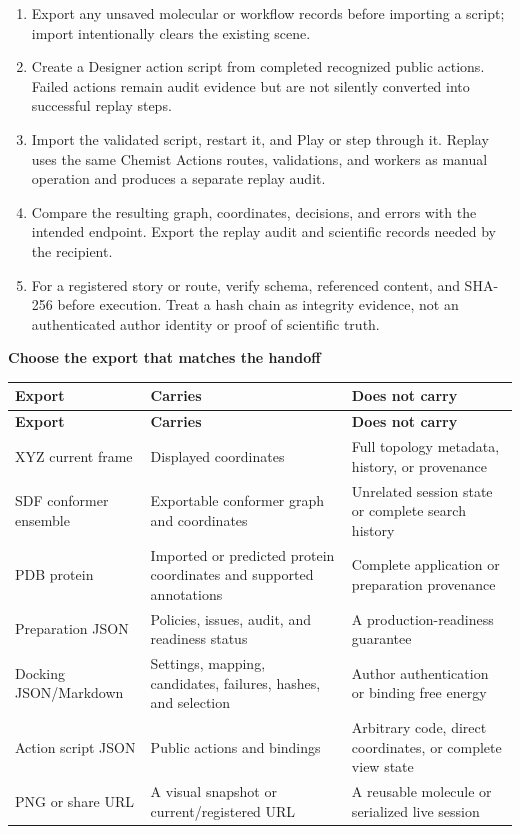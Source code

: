 \documentclass[10pt,letterpaper]{article}
\newcommand{\subhead}[1]{%
  \par\needspace{2\baselineskip}\vspace{2.5pt}%
  {\fontsize{10.91}{13.1}\selectfont\bfseries #1}\par\vspace{-1.5pt}}
\begin{document}
\begin{enumerate}
\item Export any unsaved molecular or workflow records before importing a script; import intentionally clears the existing scene.
\item Create a Designer action script from completed recognized public actions. Failed actions remain audit evidence but are not silently converted into successful replay steps.
\item Import the validated script, restart it, and Play or step through it. Replay uses the same Chemist Actions routes, validations, and workers as manual operation and produces a separate replay audit.
\item Compare the resulting graph, coordinates, decisions, and errors with the intended endpoint. Export the replay audit and scientific records needed by the recipient.
\item For a registered story or route, verify schema, referenced content, and SHA-256 before execution. Treat a hash chain as integrity evidence, not an authenticated author identity or proof of scientific truth.
\end{enumerate}

\subhead{Choose the export that matches the handoff}

\begingroup
\fontsize{8.0}{9.5}\selectfont
\begin{longtable}{@{}p{1.20in}p{2.48in}p{2.92in}@{}}
\toprule
\textbf{Export} & \textbf{Carries} & \textbf{Does not carry}\\
\midrule
\endfirsthead
\toprule
\textbf{Export} & \textbf{Carries} & \textbf{Does not carry}\\
\midrule
\endhead
XYZ current frame & Displayed coordinates & Full topology metadata, history, or provenance\\
SDF conformer ensemble & Exportable conformer graph and coordinates & Unrelated session state or complete search history\\
PDB protein & Imported or predicted protein coordinates and supported annotations & Complete application or preparation provenance\\
Preparation JSON & Policies, issues, audit, and readiness status & A production-readiness guarantee\\
Docking JSON/Markdown & Settings, mapping, candidates, failures, hashes, and selection & Author authentication or binding free energy\\
Action script JSON & Public actions and bindings & Arbitrary code, direct coordinates, or complete view state\\
PNG or share URL & A visual snapshot or current/registered URL & A reusable molecule or serialized live session\\
\bottomrule
\end{longtable}
\endgroup
\end{document}
